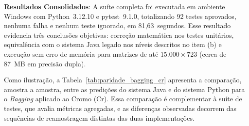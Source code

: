 \item[d)] \textbf{Resultados Consolidados}: A suíte completa foi executada em
ambiente Windows com Python~3.12.10 e pytest~9.1.0, totalizando 92 testes
aprovados, nenhuma falha e nenhum teste ignorado, em 81{,}63~segundos.
Esse resultado evidencia três conclusões objetivas: correção matemática nos
testes unitários, equivalência com o sistema Java legado nos níveis descritos
no item (b) e execução sem erro de memória para matrizes de até
$15.000\times723$ (cerca de 87~MB em precisão dupla).


%
Como ilustração, a Tabela~\ref{tab:paridade_bagging_cr} apresenta a
comparação, amostra a amostra, entre as predições do sistema Java e do
sistema Python para o \textit{Bagging} aplicado ao Cromo (Cr). Essa
comparação é complementar à suíte de testes, que avalia métricas agregadas,
e as diferenças observadas decorrem das sequências de reamostragem distintas
das duas implementações.
%
%



